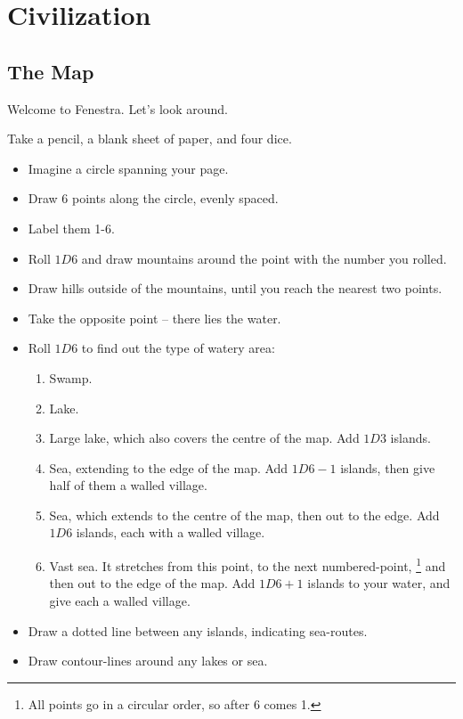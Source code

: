 \chapter{Civilization}

\section{The Map}

\begin{multicols}{2}

Welcome to Fenestra. Let's look around.


Take a pencil, a blank sheet of paper, and four dice.

\begin{itemize}
\item
  Imagine a circle spanning your page.
\item
  Draw 6 points along the circle, evenly spaced.
\item
  Label them 1-6.
\item
  Roll $1D6$ and draw mountains around the point with the number you rolled.
\item
  Draw hills outside of the mountains, until you reach the nearest two points.
\item
  Take the opposite point -- there lies the water.
\item
  Roll $1D6$ to find out the type of watery area:

  \begin{enumerate}
  \item
    Swamp.
  \item
    Lake.
  \item
    Large lake, which also covers the centre of the map.
    Add $1D3$ islands.
  \item
    Sea, extending to the edge of the map.
    Add $1D6-1$ islands, then give half of them a walled village.
  \item
    Sea, which extends to the centre of the map, then out to the edge.
    Add $1D6$ islands, each with a walled village.
  \item
    Vast sea. It stretches from this point, to the next numbered-point,%
    \footnote{All points go in a circular order, so after 6 comes 1.}
    and then out to the edge of the map.
    Add $1D6+1$ islands to your water, and give each a walled village.
  \end{enumerate}
\item
  Draw a dotted line between any islands, indicating sea-routes.
\item
  Draw contour-lines around any lakes or sea.
\end{itemize}


\end{multicols}
